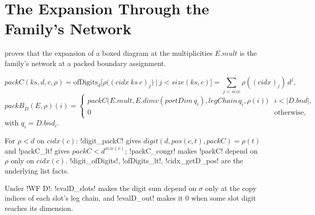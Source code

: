 {\section{The Expansion Through the Family's Network}\label{sec:boxes-fambridge}

 proves that the expansion of a boxed diagram at the multiplicities $E.\mathit{mult}$ is the family's network at a packed boundary assignment.

\begin{definition}[Packing]\label{def:boxes-packC}
\[
\mathit{packC}(\mathit{ks},d,c,\rho)=\mathrm{ofDigits}_d\bigl[\rho\bigl((\mathit{cidx}\ \mathit{ks}\ c)_j\bigr)\ \big|\ j<\mathit{size}(\mathit{ks},c)\bigr]=\sum_{j<\mathit{size}}\rho((\mathit{cidx})_j)\,d^j,
\]
\[
\mathit{packB}_D(E,\rho)(i)=\begin{cases}\mathit{packC}\bigl(E.\mathit{mult},E.\mathit{dimv}(\mathit{portDim}\,q_i),\mathit{legChain}\,q_i,\rho(i)\bigr) & i<|D.\mathit{bnd}|,\\ 0&\text{otherwise,}\end{cases}
\]
with $q_i=D.\mathit{bnd}_i$.
\end{definition}
For $\rho<d$ on $\mathit{cidx}(c)$: \lbx!digit_packC! gives $\mathit{digit}(d,\mathit{pos}(c,t),\mathit{packC})=\rho(t)$ and \lbx!packC_lt! gives $\mathit{packC}<d^{\mathit{size}(c)}$; \lbx!packC_congr! makes \lbx!packC! depend on $\rho$ only on $\mathit{cidx}(c)$. \lbx!digit_ofDigits!, \lbx!ofDigits_lt!, \lbx!cidx_getD_pos! are the underlying list facts.

\begin{proposition}\label{prop:boxes-evalD-slots}
Under \lbx!WF D!: \lbx!evalD_slots! makes the digit sum depend on $\sigma$ only at the copy indices of each slot's leg chain, and \lbx!evalD_out! makes it $0$ when some slot digit reaches its dimension.
\end{proposition}

}
